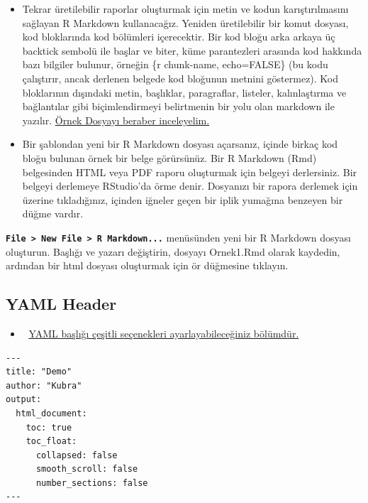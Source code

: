 \documentclass[
  oneside]{book}
\providecommand{\tightlist}{%
  \setlength{\itemsep}{0pt}\setlength{\parskip}{0pt}}
\begin{document}
\begin{itemize}
\item
  Tekrar üretilebilir raporlar oluşturmak için metin ve kodun karıştırılmasını sağlayan R Markdown kullanacağız. Yeniden üretilebilir bir komut dosyası, kod bloklarında kod bölümleri içerecektir. Bir kod bloğu arka arkaya üç backtick sembolü ile başlar ve biter, küme parantezleri arasında kod hakkında bazı bilgiler bulunur, örneğin \{r chunk-name, echo=FALSE\} (bu kodu çalıştırır, ancak derlenen belgede kod bloğunun metnini göstermez). Kod bloklarının dışındaki metin, başlıklar, paragraflar, listeler, kalınlaştırma ve bağlantılar gibi biçimlendirmeyi belirtmenin bir yolu olan markdown ile yazılır. \href{https://raw.githubusercontent.com/atalay-k/OLC731/main/docs/repro.Rmd}{Örnek Dosyayı beraber inceleyelim.}
\item
  Bir şablondan yeni bir R Markdown dosyası açarsanız, içinde birkaç kod bloğu bulunan örnek bir belge görürsünüz. Bir R Markdown (Rmd) belgesinden HTML veya PDF raporu oluşturmak için belgeyi derlersiniz. Bir belgeyi derlemeye RStudio'da örme denir. Dosyanızı bir rapora derlemek için üzerine tıkladığınız, içinden iğneler geçen bir iplik yumağına benzeyen bir düğme vardır.
\end{itemize}

\begin{try}
\textbf{\texttt{File\ \textgreater{}\ New\ File\ \textgreater{}\ R\ Markdown...}} menüsünden yeni bir R Markdown dosyası oluşturun. Başlığı ve yazarı değiştirin, dosyayı Ornek1.Rmd olarak kaydedin, ardından bir html dosyası oluşturmak için ör düğmesine tıklayın.

\end{try}

\hypertarget{yaml}{%
\subsection{YAML Header}\label{yaml}}

\begin{itemize}
\tightlist
\item
  🔗 \href{https://bookdown.org/yihui/rmarkdown/html-document.html}{YAML başlığı çeşitli seçenekleri ayarlayabileceğiniz bölümdür.}
\end{itemize}

\begin{verbatim}
---
title: "Demo"
author: "Kubra"
output:
  html_document:
    toc: true
    toc_float:
      collapsed: false
      smooth_scroll: false
      number_sections: false
---
\end{verbatim}
\end{document}
